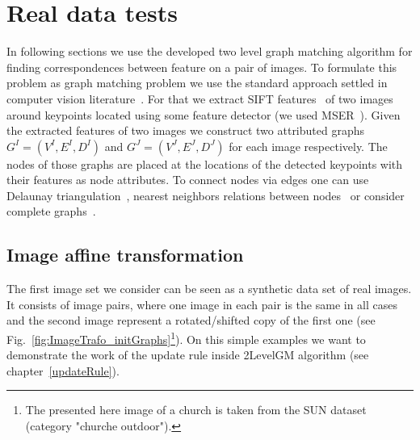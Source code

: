 \section{Real data tests}
In following sections we use the developed two level graph matching algorithm for finding correspondences between feature on a pair of images. To formulate this problem as graph matching problem we use the standard approach settled in computer vision literature~\cite{Cho2010_RRWM,Cho2012_ProgressiveGM,FastPFP,Hancock_EM_SVD,Hancock_GM_SpectralPart}. For that we extract SIFT features~\cite{Lowe2004} of two images around keypoints located using some feature detector (we used  MSER~\cite{MSER}). Given the extracted features of two images we construct two attributed graphs $G^I=(V^I,E^I,D^I)$ and $G^J=(V^J,E^J,D^J)$ for each image respectively. The nodes of those graphs are placed at the locations of the detected keypoints with their features as node attributes. To connect nodes via edges one can use Delaunay triangulation~\cite{Hancock_EM_SVD,Hancock_GM_SpectralPart}, nearest neighbors relations between nodes~\cite{Sanrom2012} or consider complete graphs~\cite{Cho2012_ProgressiveGM,Cho2014_Haystack}.

\subsection{Image affine transformation}
The first image set we consider can be seen as a synthetic data set of real images. It consists of image pairs, where one image in each pair is the same in all cases and the second image represent a rotated/shifted copy of the first one (see Fig.~\ref{fig:ImageTrafo_initGraphs}\footnote{The presented here image of a church is taken from the SUN\cite{SUN} dataset (category "churche outdoor").}). On this simple examples we want to demonstrate the work of the update rule inside 2LevelGM algorithm (see chapter~\ref{updateRule}).


